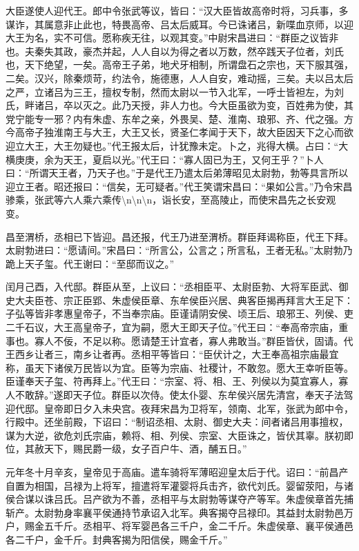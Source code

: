 \documentclass[]{article}
\begin{document}
大臣遂使人迎代王。郎中令张武等议，皆曰：``汉大臣皆故高帝时将，习兵事，多谋诈，其属意非止此也，特畏高帝、吕太后威耳。今已诛诸吕，新喋血京师，以迎大王为名，实不可信。愿称疾无往，以观其变。''中尉宋昌进曰：``群臣之议皆非也。夫秦失其政，豪杰并起，人人自以为得之者以万数，然卒践天子位者，刘氏也，天下绝望，一矣。高帝王子弟，地犬牙相制，所谓盘石之宗也，天下服其强，二矣。汉兴，除秦烦苛，约法令，施德惠，人人自安，难动摇，三矣。夫以吕太后之严，立诸吕为三王，擅权专制，然而太尉以一节入北军，一呼士皆袒左，为刘氏，畔诸吕，卒以灭之。此乃天授，非人力也。今大臣虽欲为变，百姓弗为使，其党宁能专一邪？内有朱虚、东牟之亲，外畏吴、楚、淮南、琅邪、齐、代之强。方今高帝子独淮南王与大王，大王又长，贤圣仁孝闻于天下，故大臣因天下之心而欲迎立大王，大王勿疑也。''代王报太后，计犹豫未定。卜之，兆得大横。占曰：``大横庚庚，余为天王，夏启以光。''代王曰：``寡人固已为王，又何王乎？''卜人曰：``所谓天王者，乃天子也。''于是代王乃遣太后弟薄昭见太尉勃，勃等具言所以迎立王者。昭还报曰：``信矣，无可疑者。''代王笑谓宋昌曰：``果如公言。''乃令宋昌骖乘，张武等六人乘六乘传\textbackslash{}n\textbackslash{}n\textbackslash{}n，诣长安，至高陵止，而使宋昌先之长安观变。

昌至渭桥，丞相已下皆迎。昌还报，代王乃进至渭桥。群臣拜谒称臣，代王下拜。太尉勃进曰：``愿请间。''宋昌曰：``所言公，公言之；所言私，王者无私。''太尉勃乃跪上天子玺。代王谢曰：``至邸而议之。''

闰月己酉，入代邸。群臣从至，上议曰：``丞相臣平、太尉臣勃、大将军臣武、御史大夫臣苍、宗正臣郢、朱虚侯臣章、东牟侯臣兴居、典客臣揭再拜言大王足下：子弘等皆非孝惠皇帝子，不当奉宗庙。臣谨请阴安侯、顷王后、琅邪王、列侯、吏二千石议，大王高皇帝子，宜为嗣，愿大王即天子位。''代王曰：``奉高帝宗庙，重事也。寡人不佞，不足以称。愿请楚王计宜者，寡人弗敢当。''群臣皆伏，固请。代王西乡让者三，南乡让者再。丞相平等皆曰：``臣伏计之，大王奉高祖宗庙最宜称，虽天下诸侯万民皆以为宜。臣等为宗庙、社稷计，不敢忽。愿大王幸听臣等。臣谨奉天子玺、符再拜上。''代王曰：``宗室、将、相、王、列侯以为莫宜寡人，寡人不敢辞。''遂即天子位。群臣以次侍。使太仆婴、东牟侯兴居先清宫，奉天子法驾迎代邸。皇帝即日夕入未央宫。夜拜宋昌为卫将军，领南、北军，张武为郎中令，行殿中。还坐前殿，下诏曰：``制诏丞相、太尉、御史大夫：间者诸吕用事擅权，谋为大逆，欲危刘氏宗庙，赖将、相、列侯、宗室、大臣诛之，皆伏其辜。朕初即位，其赦天下，赐民爵一级，女子百户牛、酒，酺五日。''

元年冬十月辛亥，皇帝见于高庙。遣车骑将军薄昭迎皇太后于代。诏曰：``前昌产自置为相国，吕禄为上将军，擅遣将军灌婴将兵击齐，欲代刘氏。婴留荥阳，与诸侯合谋以诛吕氏。吕产欲为不善，丞相平与太尉勃等谋夺产等军。朱虚侯章首先捕斩产。太尉勃身率襄平侯通持节承诏入北军。典客揭夺吕禄印。其益封太尉勃邑万户，赐金五千斤。丞相平、将军婴邑各三千户，金二千斤。朱虚侯章、襄平侯通邑各二千户，金千斤。封典客揭为阳信侯，赐金千斤。''
\end{document}
